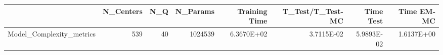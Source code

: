 \begin{tabular}{lrrrrrrr}
\toprule
{} &  N\_Centers &  N\_Q &  N\_Params &  Training Time &  T\_Test/T\_Test-MC &  Time Test &  Time EM-MC \\
\midrule
Model\_Complexity\_metrics &        539 &   40 &   1024539 &     6.3670E+02 &        3.7115E-02 & 5.9893E-02 &  1.6137E+00 \\
\bottomrule
\end{tabular}
